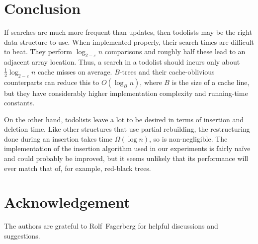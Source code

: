 \documentclass{patmorin}
\newcommand{\eps}{\varepsilon}
\begin{document}
\section{Conclusion}

If searches are much more frequent than updates, then todolists may
be the right data structure to use.  When implemented properly, their
search times are difficult to beat.  They perform $\log_{2-\eps}
n$ comparisons and roughly half these lead to an adjacent array
location. Thus, a search in a todolist should incurs only about
$\frac{1}{2}\log_{2-\eps} n$ cache misses on average.   $B$-trees
\cite{bayer.mccreight:organization} and their cache-oblivious counterparts
\cite{bender.demaine.ea:cache-oblivious,bender.duan.ea:locality-preserving}
can reduce this to $O(\log_B n)$, where $B$ is the size of a cache line,
but they have considerably higher implementation complexity and running-time
constants.


On the other hand, todolists leave a lot to be desired in terms of
insertion and deletion time.  Like other structures that use partial
rebuilding, the restructuring done during an insertion takes time
$\Omega(\log n)$, so is non-negligible.  The implementation of the
insertion algorithm used in our experiments is fairly naïve and could
probably be improved, but it seems unlikely that its performance will
ever match that of, for example, red-black trees.

\section*{Acknowledgement}

The authors are grateful to Rolf~Fagerberg for helpful discussions
and suggestions.






\end{document}
